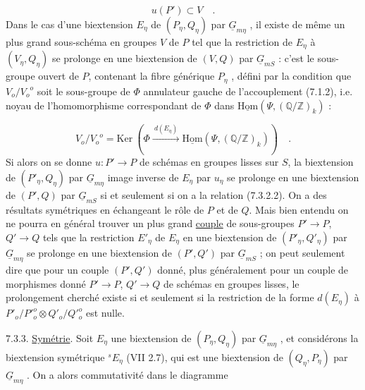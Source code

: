 \begin{equation}\tag{7.3.2.2}
u(P') \subset V \quad .
\end{equation}
Dans le cas d'une biextension $E_\eta$ de $(P_\eta , Q_\eta)$ par $\underline{G}_{m\eta}$ , il existe de même un plus grand sous-schéma en groupes $V$ de $P$ tel que la restriction de $E_\eta$ à $(V_\eta , Q_\eta)$ se prolonge en une biextension de $(V,Q)$ par $\underline{G}_{mS}$ : c'est le sous-groupe ouvert de $P$, contenant la fibre générique $P_\eta$ , défini par la condition que $V_o/{V_o}^{o}$ soit le sous-groupe de $\Phi$ annulateur gauche de l'accouplement (7.1.2), i.e. noyau de l'homomorphisme correspondant de $\Phi$ dans $\underline{\mathrm{Hom}}(\Psi, (\mathbb{Q}/\mathbb{Z})_k)$ :

\begin{equation}\tag{7.3.2.3}
V_o/{V_o}^{o} = \mathrm{Ker}\ (\Phi \xrightarrow{\ d(E_\eta)\ } \underline{\mathrm{Hom}}(\Psi ,(\mathbb{Q}/\mathbb{Z} )_k)) \quad .
\end{equation}
Si alors on se donne $u: P' \longrightarrow P$ de schémas en groupes lisses sur $S$, la biextension de $(P'_\eta , Q_\eta)$ par $\underline{G}_{m\eta}$ image inverse de $E_\eta$ par $u_\eta$ se prolonge en une biextension de $(P',Q)$ par $\underline{G}_{mS}$ si et seulement si on a la relation (7.3.2.2). On a des résultats symétriques en échangeant le rôle de $P$ et de $Q$. Mais bien entendu on ne pourra en général trouver un plus grand \underline{couple} de sous-groupes $P' \longrightarrow P$, $Q' \longrightarrow Q$ tels que la restriction $E'_\eta$ de $E_\eta$ en une biextension de $(P'_\eta , Q'_\eta)$ par $\underline{G}_{m\eta}$ se prolonge en une biextension de $(P',Q')$ par $\underline{G}_{mS}$ ; on peut seulement dire que pour un couple
$(P',Q')$ donné, plus généralement pour un couple de morphismes donné $P' \longrightarrow P$, $Q' \longrightarrow Q$ de schémas en groupes lisses, le prolongement cherché existe si et seulement si la restriction de la forme $d(E_\eta)$ à $P'_o/P'^o_o \otimes Q'_o/Q'^o_o$ est nulle.

7.3.3. \underline{Symétrie}. Soit $E_\eta$ une biextension de $(P_\eta , Q_\eta)$ par $\underline{G}_{m\eta}$ , et considérons la biextension symétrique ${}^{s}E_\eta$ (VII 2.7), qui est une biextension de $(Q_\eta , P_\eta)$ par $\underline{G}_{m\eta}$ . On a alors commutativité dans le diagramme

